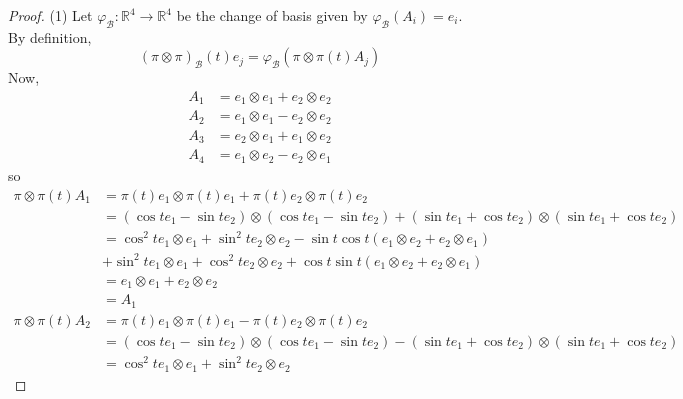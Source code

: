 \documentclass[reqno]{amsart}
\theoremstyle{definition}
\theoremstyle{remark}
\begin{document}
    \begin{proof}
        (1) 
        Let $\varphi_{\mathcal{B}}
        \colon \mathbb{R}^4 \to \mathbb{R}^{4}$ be the
        change of basis given by
        $\varphi_{\mathcal{B}}
        (A_i) = e_i$.\\
        By definition,
        \[
            \left( \pi \otimes \pi \right)_{\mathcal{B}}
            (t) e_j =
            \varphi_{\mathcal{B}}
            \left( \pi \otimes \pi(t)  A_j \right) 
        \] 
        Now,
        \begin{align*}
            A_1 &= e_1 \otimes e_1 + e_2 \otimes e_2\\
            A_2 &= e_1 \otimes e_1 - e_2 \otimes e_2\\
            A_3 &= e_2 \otimes e_1 + e_1 \otimes e_2\\
            A_4 &= e_1 \otimes e_2 - e_2 \otimes e_1
        \end{align*}
        so
        \begin{align*}
            \pi \otimes \pi(t) A_1
            &= \pi(t) e_1 \otimes \pi(t) e_1 +
            \pi(t) e_2 \otimes \pi(t) e_2\\
            &= 
            \left( \cos t e_1 - \sin
            t e_2 \right) \otimes
            \left( \cos t e_1- \sin t e_2 \right)
            + \left( \sin t e_1 + \cos t e_2 \right) 
            \otimes \left( \sin t e_1 + \cos t e_2 \right) \\
            &= \cos^2 t e_1 \otimes e_1 + \sin^2 t e_2 \otimes
            e_2 - \sin t \cos t
            \left( e_1 \otimes e_2 + e_2 \otimes e_1 \right) \\
            &+ \sin^2 t e_1 \otimes e_1
            + \cos^2 t e_2 \otimes e_2
            + \cos t \sin t 
            \left( e_1 \otimes e_2 + e_2 \otimes e_1 \right) \\
            &= e_1 \otimes e_1
            + e_2 \otimes e_2\\
            &= A_1\\
            \pi \otimes \pi(t) A_2
            &= \pi(t) e_1 \otimes \pi(t) e_1
            - \pi(t) e_2 \otimes \pi(t) e_2\\
            &= \left( 
            \cos t e_1 - \sin t e_2\right) 
            \otimes \left( \cos t e_1 - \sin t e_2 \right) 
            - \left( \sin t e_1 + \cos t e_2 \right) 
            \otimes \left( \sin t e_1 + \cos t e_2 \right) \\
            &= \cos^2 t e_1 \otimes e_1
            + \sin^2 t e_2 \otimes e_2

\end{align*}
\end{proof}
\end{document}
